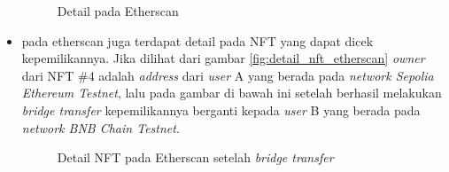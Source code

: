 \begin{itemize}
    \begin{figure} [H] \centering
    \caption{Detail pada Etherscan}
    \label{fig:detail_etherscan}
    \end{figure}

    \item pada etherscan juga terdapat detail pada NFT yang dapat dicek kepemilikannya. Jika dilihat dari gambar \ref{fig:detail_nft_etherscan} \emph{owner} dari NFT \#4 adalah \emph{address} dari \emph{user} A yang berada pada \emph{network Sepolia Ethereum Testnet}, lalu pada gambar di bawah ini setelah berhasil melakukan \emph{bridge transfer} kepemilikannya berganti kepada \emph{user} B yang berada pada \emph{network BNB Chain Testnet}.

    \begin{figure} [H] \centering
    \caption{Detail NFT pada Etherscan setelah \emph{bridge transfer}}
    \label{fig:nft_bridge_transfer}
    \end{figure}


\end{itemize}
